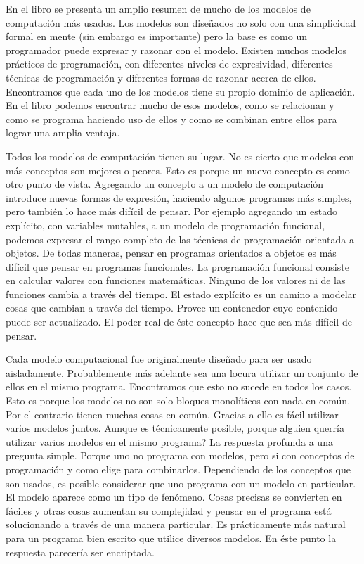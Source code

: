 \documentclass[a4paper,11pt]{article}
\begin{document}
En el libro se presenta un amplio resumen de mucho de los modelos de computación más usados. Los modelos son diseñados no solo con una simplicidad formal en mente (sin embargo es importante) pero la base es como un programador puede expresar y razonar con el modelo. Existen muchos modelos prácticos de programación, con diferentes niveles de expresividad, diferentes técnicas de programación y diferentes formas de razonar acerca de ellos. Encontramos que cada uno de los modelos tiene su propio dominio de aplicación.
En el libro podemos encontrar mucho de esos modelos, como se relacionan y como se programa haciendo uso de ellos y como se combinan entre ellos para lograr una amplia ventaja.

Todos los modelos de computación tienen su lugar. No es cierto que modelos con más conceptos son mejores o peores. Esto es porque un nuevo concepto es como otro punto de vista. Agregando un concepto a un modelo de computación introduce nuevas formas de expresión, haciendo algunos programas más simples, pero también lo hace más difícil de pensar. Por ejemplo agregando un estado explícito, con variables mutables, a un modelo de programación funcional, podemos expresar el rango completo de las técnicas de programación orientada a objetos. De todas maneras, pensar en programas orientados a objetos es más difícil que pensar en programas funcionales. La programación funcional consiste en calcular valores con funciones matemáticas. Ninguno de los valores ni de las funciones cambia a través del tiempo. El estado explícito es un camino a modelar cosas que cambian a través del tiempo. Provee un contenedor cuyo contenido puede ser actualizado. El poder real de éste concepto hace que sea más difícil de pensar.

Cada modelo computacional fue originalmente diseñado para ser usado aisladamente. Probablemente más adelante sea una locura utilizar un conjunto de ellos en el mismo programa. Encontramos que esto no sucede en todos los casos. Esto es porque los modelos no son solo bloques monolíticos con nada en común. Por el contrario tienen muchas cosas en común.
Gracias a ello es fácil utilizar varios modelos juntos.
Aunque es técnicamente posible, porque alguien querría utilizar varios modelos en el mismo programa? La respuesta profunda a una pregunta simple. Porque uno no programa con modelos, pero si con conceptos de programación y como elige para combinarlos. Dependiendo de los conceptos que son usados, es posible considerar que uno programa con un modelo en particular. El modelo aparece como un tipo de fenómeno. Cosas precisas se convierten en fáciles y otras cosas aumentan su complejidad y pensar en el programa está solucionando a través de una manera particular. Es prácticamente más natural para un programa bien escrito que utilice diversos modelos. En éste punto la respuesta parecería ser encriptada.
\end{document}
